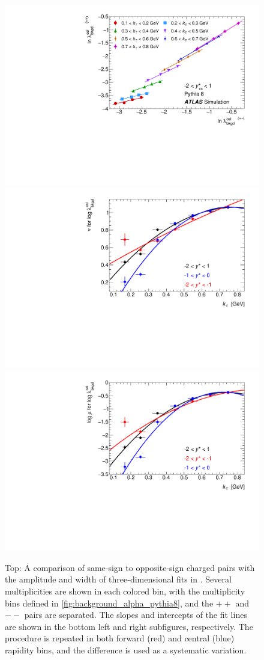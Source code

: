 \begin{figure}[t]
\begin{minipage}[t]{1.0\textwidth}
\centering
\includegraphics{can_kt_qosl_backLambda.pdf}\\
\includegraphics[width=.49\linewidth]{can_kt_qosl_backLambda_slope_combined.pdf}
\includegraphics[width=.49\linewidth]{can_kt_qosl_backLambda_intercept_combined.pdf}
\end{minipage}
\caption{
Top: A comparison of same-sign to opposite-sign charged pairs with the amplitude and width of three-dimensional fits in . Several multiplicities are shown in each colored \kt bin, with the multiplicity bins defined in \cref{fig:background_alpha_pythia8}, and the $++$ and $--$ pairs are separated. The slopes and intercepts of the fit lines are shown in the bottom left and right subfigures, respectively. The procedure is repeated in both forward (red) and central (blue) rapidity bins, and the difference is used as a systematic variation.}
\label{fig:background_qosl_lambda_same_vs_opp_pythia8}
\end{figure}

